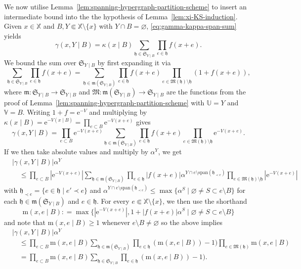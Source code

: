 \documentclass[reqno, 11pt]{amsart}
\theoremstyle{definition}
\newcommand{\e}{\mathrm{e}}
\newcommand{\X}{\mathbb X}
\newcommand{\V}{\mathbb V}
\newcommand{\U}{\mathbb U}
\begin{document}
We now utilise Lemma~\ref{lem:spanning-hypergraph-partition-scheme} to insert an intermediate bound into the the hypothesis of Lemma~\ref{lem:xi-KS-induction}. 
Given $x \in \X$ and $B, Y \Subset \X \setminus \{x\}$ with $Y \cap B = \varnothing$,  \eqref{eq:gamma-kappa-span-sum} yields
\[
	\gamma(x, Y \mid B) = \kappa(x \mid B) \sum_{\mathfrak h \in \mathfrak S_{Y \mid B}} \prod_{e \in \mathfrak h} f(x + e).
\]
We bound the sum over $\mathfrak S_{Y \mid B}$ by first expanding it via
\[
	\sum_{\mathfrak h \in \mathfrak S_{Y \mid B}} \prod_{e \in \mathfrak h} f(x + e) = \sum_{\mathfrak h \in \mathfrak m(\mathfrak S_{Y \mid B})} \prod_{e \in \mathfrak h} f(x + e) \prod_{e \in \mathfrak M(\mathfrak h) \setminus \mathfrak h} (1 + f(x + e)),
\]
where $\mathfrak m : \mathfrak S_{Y \mid B} \to \mathfrak S_{Y \mid B}$ and $\mathfrak M : \mathfrak m(\mathfrak S_{Y \mid B}) \to \mathfrak S_{Y \mid B}$ are the functions from the proof of Lemma~\ref{lem:spanning-hypergraph-partition-scheme} with $\U = Y$ and $\V = B$. 
Writing $1+f = \e^{-V}$ and multiplying by $\kappa(x \mid B) = \e^{- V(x \mid B)} = \prod_{e \subset B} \e^{- V(x + e)}$ gives
\[
	\gamma(x, Y \mid B) = \prod_{e \subset B} \e^{- V(x + e)} \sum_{\mathfrak h \in \mathfrak m(\mathfrak S_{Y \mid B})} \prod_{e \in \mathfrak h} f(x + e) \prod_{e \in \mathfrak M(\mathfrak h) \setminus \mathfrak h} \e^{-V(x + e)}.
\]
If we then take absolute values and multiply by $\alpha^Y$, we get
\begin{align*}
	& |\gamma(x, Y \mid B)| \alpha^Y \\
	& \quad \leq \prod_{e \subset B} |\e^{- V(x + e)}| \sum_{\mathfrak h \in \mathfrak m(\mathfrak S_{Y \mid B})} \prod_{e \in \mathfrak h} |f(x + e)| \alpha^{Y \cap e \setminus \mathrm{span}(\mathfrak h_{\prec e})} \prod_{e \in \mathfrak M(\mathfrak h) \setminus \mathfrak h} |\e^{-V(x + e)}|
\end{align*}
with $\mathfrak h_{\prec e} = \{e \in \mathfrak h \mid e' \prec e\}$ and 
$\alpha^{Y \cap e \setminus \mathrm{span}(\mathfrak h_{\prec e})} \leq \max\{\alpha^S \mid \varnothing \neq S \subset e \setminus B\}$ for each $\mathfrak h \in \mathfrak m(\mathfrak S_{Y \mid B})$ and $e \in \mathfrak h$. 
For every $e \Subset \X \setminus \{x\}$, we then use the shorthand
\[
	\mathrm{m}(x, e \mid B) : = \max\{|\e^{-V(x+e)}|, 1 + |f(x + e)| \alpha^S \mid \varnothing \neq S \subset e \setminus B\}
\]
and note that $\mathrm{m}(x, e \mid B) \geq 1$ whenever $e \setminus B \neq \varnothing$ so the above implies
\begin{align*}
	& |\gamma(x, Y \mid B)| \alpha^Y \\
	& \quad \leq \prod_{e \subset B} \mathrm{m}(x, e \mid B) \sum_{\mathfrak h \in \mathfrak m(\mathfrak S_{Y \mid B})} \prod_{e \in \mathfrak h} (\mathrm{m}(x, e \mid B)) - 1) \prod_{e \in \mathfrak M(\mathfrak h)} \mathrm{m}(x, e \mid B) \\
	& \quad = \prod_{e \subset B} \mathrm{m}(x, e \mid B) \sum_{\mathfrak h \in \mathfrak S_{Y \mid B}} \prod_{e \in \mathfrak h} (\mathrm{m}(x, e \mid B)) - 1).
\end{align*}
\end{document}
